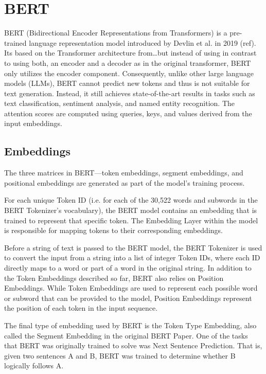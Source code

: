 \section{BERT}
BERT (Bidirectional Encoder Representations from Transformers) is a  pre-trained language representation model introduced by Devlin et al. in 2019 (ref). Its based on the Transformer architecture from\dots but instead of using in contrast to using both, an encoder and a decoder as in the original transformer, BERT only utilizes the encoder component. Consequently, unlike other large language models (LLMs), BERT cannot predict new tokens and thus is not suitable for text generation. Instead, it still achieves state-of-the-art results in tasks such as text classification, sentiment analysis, and named entity recognition. The attention scores are computed using queries, keys, and values derived from the input embeddings.

\subsection{Embeddings}
The three matrices in BERT—token embeddings, segment embeddings, and positional embeddings are generated as part of the model's training process.

For each unique Token ID (i.e. for each of the 30,522 words and subwords in the BERT Tokenizer’s vocabulary), the BERT model contains an embedding that is trained to represent that specific token. The Embedding Layer within the model is responsible for mapping tokens to their corresponding embeddings.

Before a string of text is passed to the BERT model, the BERT Tokenizer is used to convert the input from a string into a list of integer Token IDs, where each ID directly maps to a word or part of a word in the original string. In addition to the Token Embeddings described so far, BERT also relies on Position Embeddings. While Token Embeddings are used to represent each possible word or subword that can be provided to the model, Position Embeddings represent the position of each token in the input sequence.

The final type of embedding used by BERT is the Token Type Embedding, also called the Segment Embedding in the original BERT Paper. One of the tasks that BERT was originally trained to solve was Next Sentence Prediction. That is, given two sentences A and B, BERT was trained to determine whether B logically follows A.\\

